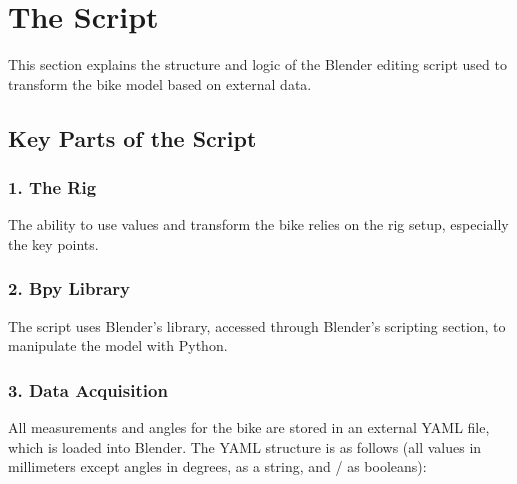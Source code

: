 \documentclass[letterpaper,10pt,english]{jupyterBook}
\begin{document}
\sphinxstepscope


\section{The Script}
\label{\detokenize{Edit Script:the-script}}\label{\detokenize{Edit Script::doc}}
\sphinxAtStartPar
This section explains the structure and logic of the Blender editing script used to transform the bike model based on external data.


\subsection{Key Parts of the Script}
\label{\detokenize{Edit Script:key-parts-of-the-script}}

\subsubsection{1. The Rig}
\label{\detokenize{Edit Script:the-rig}}
\sphinxAtStartPar
The ability to use values and transform the bike relies on the rig setup, especially the key points.


\subsubsection{2. Bpy Library}
\label{\detokenize{Edit Script:bpy-library}}
\sphinxAtStartPar
The script uses Blender’s  library, accessed through Blender’s scripting section, to manipulate the model with Python.


\subsubsection{3. Data Acquisition}
\label{\detokenize{Edit Script:data-acquisition}}
\sphinxAtStartPar
All measurements and angles for the bike are stored in an external YAML file, which is loaded into Blender. The YAML structure is as follows (all values in millimeters except angles in degrees,  as a string, and / as booleans):
\end{document}
